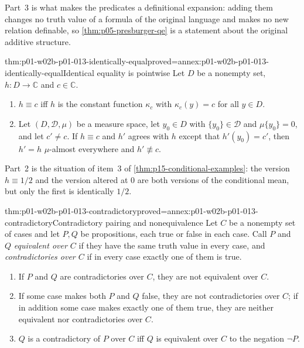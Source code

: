 Part~3 is what makes the predicates a definitional expansion: adding them
changes no truth value of a formula of the original language and makes no
new relation definable, so \cref{thm:p05-presburger-qe} is a statement about
the original additive structure.

\begin{hblemma}{thm:p01-w02b-p01-013-identically-equal}{proved=annex:p01-w02b-p01-013-identically-equal}{Identical equality is pointwise}
Let \(D\) be a nonempty set, \(h:D\to\mathbb C\) and \(c\in\mathbb C\).
\begin{enumerate}
  \item \(h\equiv c\) iff \(h\) is the constant function \(\kappa_c\) with
  \(\kappa_c(y)=c\) for all \(y\in D\).
  \item Let \((D,\mathcal D,\mu)\) be a measure space, let \(y_0\in D\) with
  \(\{y_0\}\in\mathcal D\) and \(\mu\{y_0\}=0\), and let \(c'\neq c\).  If
  \(h\equiv c\) and \(h'\) agrees with \(h\) except that \(h'(y_0)=c'\), then
  \(h'=h\) \(\mu\)-almost everywhere and \(h'\not\equiv c\).
\end{enumerate}
\end{hblemma}

Part~2 is the situation of item~3 of \cref{thm:p15-conditional-examples}:
the version \(h\equiv1/2\) and the version altered at \(0\) are both versions
of the conditional mean, but only the first is identically \(1/2\).

\begin{hblemma}{thm:p01-w02b-p01-013-contradictory}{proved=annex:p01-w02b-p01-013-contradictory}{Contradictory pairing and nonequivalence}
Let \(C\) be a nonempty set of cases and let \(P,Q\) be propositions, each
true or false in each case.  Call \(P\) and \(Q\) \emph{equivalent over
\(C\)} if they have the same truth value in every case, and
\emph{contradictories over \(C\)} if in every case exactly one of them is
true.
\begin{enumerate}
  \item If \(P\) and \(Q\) are contradictories over \(C\), they are not
  equivalent over \(C\).
  \item If some case makes both \(P\) and \(Q\) false, they are not
  contradictories over \(C\); if in addition some case makes exactly one of
  them true, they are neither equivalent nor contradictories over \(C\).
  \item \(Q\) is a contradictory of \(P\) over \(C\) iff \(Q\) is equivalent
  over \(C\) to the negation \(\neg P\).
\end{enumerate}
\end{hblemma}

